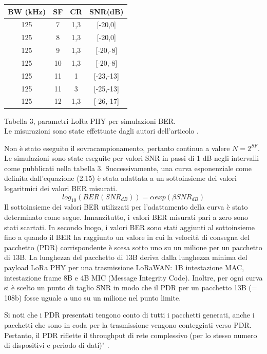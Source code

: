 \documentclass[a4paper]{report} %
\begin{document}
\begin{enumerate}
\begin{center}
\begin{tabular}{|c|c|c|c}
BW (kHz)&SF&CR&SNR(dB)\\ \hline
125&7&1,3&[-20,0]\\ \hline
125&8&1,3&[-20,0]\\ \hline
125&9&1,3&[-20,-8]\\ \hline
125&10&1,3&[-20,-8]\\ \hline
125&11&1&[-23,-13]\\ \hline
125&11&3&[-25,-13]\\ \hline
125&12&1,3&[-26,-17]\\ \hline
\end{tabular}
Tabella 3, parametri LoRa PHY per simulazioni BER. \\
Le misurazioni sono state effettuate dagli autori dell'articolo \cite{art:rif.49}. \\
\end{center}
Non è stato eseguito il sovracampionamento, pertanto continua a valere $N = 2^{SF}$. Le simulazioni sono state eseguite per valori SNR in passi di 1 dB negli intervalli come pubblicati nella tabella 3.
Successivamente, una curva esponenziale come definita dall'equazione (2.15) è stata adattata a un sottoinsieme dei valori logaritmici dei valori BER misurati.
\begin{equation}
log_{10}(BER (SNR_{dB})) = \alpha exp (\beta SNR_{dB})
\end{equation}
Il sottoinsieme dei valori BER utilizzati per l'adattamento della curva è stato determinato come segue. Innanzitutto, i valori BER misurati pari a zero sono stati scartati. In secondo luogo, i valori BER sono stati aggiunti al sottoinsieme fino a quando il BER ha raggiunto un valore in cui la velocità di consegna del pacchetto (PDR) corrispondente è scesa sotto uno su un milione per un pacchetto di 13B. La lunghezza del pacchetto di 13B deriva dalla lunghezza minima del payload LoRa PHY per una trasmissione LoRaWAN: 1B intestazione MAC, intestazione frame 8B e 4B MIC (Message Integrity Code). Inoltre, per ogni curva si è scelto un punto di taglio SNR in modo che il PDR per un pacchetto 13B (= 108b) fosse uguale a uno su un milione nel punto limite.  
\end{enumerate}
Si noti che i PDR presentati tengono conto di tutti i pacchetti generati, anche i pacchetti che sono in coda per la trasmissione vengono conteggiati verso PDR. Pertanto, il PDR riflette il throughput di rete complessivo (per lo stesso numero di dispositivi e periodo di dati)" \cite{art:rif.49}.
\end{document}
